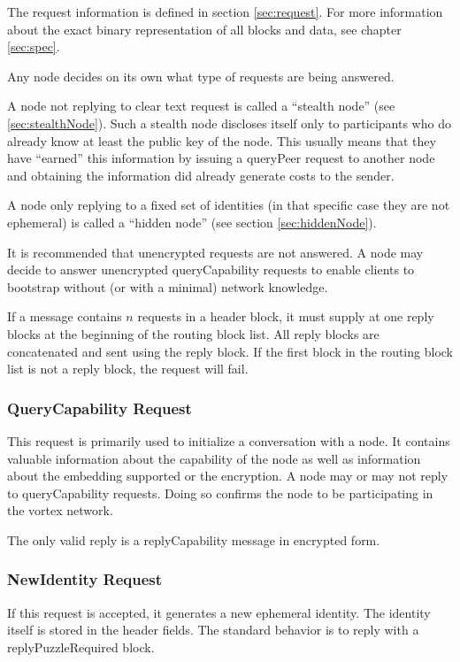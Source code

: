 The request information is defined in section \ref{sec:request}. For more information about the exact binary representation of all blocks and data, see chapter \ref{sec:spec}.

Any node decides on its own what type of requests are being answered. 

A node not replying to clear text request is called a ``stealth node'' (see \ref{sec:stealthNode}). Such a stealth node discloses itself only to participants who do already know at least the public key of the node. This usually means that they have ``earned'' this information by issuing a queryPeer request to another node and obtaining the information did already generate costs to the sender.

A node only replying to a fixed set of identities (in that specific case they are not ephemeral) is called a ``hidden node'' (see section \ref{sec:hiddenNode}).

It is recommended that unencrypted requests are not answered. A node may decide to answer unencrypted queryCapability requests to enable clients to bootstrap without (or with a minimal) network knowledge.

If a message contains $n$ requests in a header block, it must supply at one reply blocks at the beginning of the routing block list. All reply blocks are concatenated and sent using the reply block. If the first block in the routing block list is not a reply block, the request will fail.

\subsubsection{QueryCapability Request}
This request is primarily used to initialize a conversation with a node. It contains valuable information about the capability of the node as well as information about the embedding supported or the encryption. A node may or may not reply to queryCapability requests. Doing so confirms the node to be participating in the vortex network.

The only valid reply is a replyCapability message in encrypted form.

\subsubsection{NewIdentity Request}
If this request is accepted, it generates a new ephemeral identity. The identity itself is stored in the header fields. The standard behavior is to reply with a replyPuzzleRequired block. 

